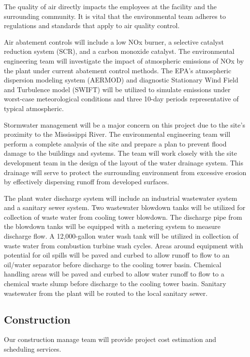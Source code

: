\documentclass{ceri}
\begin{document}
The quality of air directly impacts the employees at the facility and the surrounding community. It is vital that the environmental team adheres to regulations and standards that apply to air quality control.\\
\newline

Air abatement controls will include a low NOx burner, a selective catalyst reduction system (SCR), and a carbon monoxide catalyst. The environmental engineering team will investigate the impact of atmospheric emissions of NOx by the plant under current abatement control methods. The EPA’s atmospheric dispersion modeling system (AERMOD) and diagnostic Stationary Wind Field and Turbulence model (SWIFT) will be utilized to simulate emissions under worst-case meteorological conditions and three 10-day periods representative of typical atmospheric.\\
\newline

Stormwater management will be a major concern on this project due to the site’s proximity to the Mississippi River. The environmental engineering team will perform a complete analysis of the site and prepare a plan to prevent flood damage to the buildings and systems. The team will work closely with the site development team in the design of the layout of the water drainage system. This drainage will serve to protect the surrounding environment from excessive erosion by effectively dispersing runoff from developed surfaces. \\
\newline

The plant water discharge system will include an industrial wastewater system and a sanitary sewer system. Two wastewater blowdown tanks will be utilized for collection of waste water from cooling tower blowdown. The discharge pipe from the blowdown tanks will be equipped with a metering system to measure discharge flow. A 12,000-gallon water wash tank will be utilized in collection of waste water from combustion turbine wash cycles. Areas around equipment with potential for oil spills will be paved and curbed to allow runoff to flow to an oil/water separator before discharge to the cooling tower basin. Chemical handling areas will be paved and curbed to allow water runoff to flow to a chemical waste slump before discharge to the cooling tower basin. Sanitary wastewater from the plant will be routed to the local sanitary sewer. 

\subsection{Construction}
Our construction manage team will provide project cost estimation and scheduling services.
\end{document}
